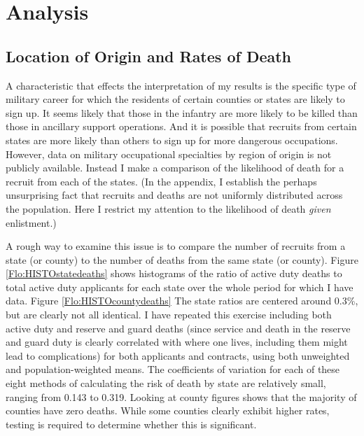 \documentclass[12pt] {article}
\begin{document}
\section{Analysis\label{sec:Analysis}}

\subsection{Location of Origin and Rates of Death}
A characteristic that effects the interpretation
of my results is the specific type of military career for which the
residents of certain counties or states are likely to sign up. It
seems likely that those in the infantry are more likely to be killed
than those in ancillary support operations. And it is possible that
recruits from certain states are more likely than others to sign up
for more dangerous occupations. However, data on military
occupational specialties by region of origin is not publicly available. Instead I make a comparison of the likelihood of death for a recruit from each
of the states. (In the appendix, I establish the perhaps unsurprising fact that recruits and deaths are not uniformly distributed across the population. Here I restrict my attention to the likelihood of death \textit{given} enlistment.) 

A rough way to examine this issue is to compare the number of recruits from a state (or county) to the number of deaths from the same state (or county). Figure \ref{Flo:HISTOstatedeaths} shows histograms of the ratio of active duty deaths to total active duty applicants for each state over the whole period for which I have data. Figure \ref{Flo:HISTOcountydeaths} The state ratios are centered around 0.3\%, but are clearly not all identical. I have repeated this exercise including both active duty and reserve and guard deaths (since service and death in the reserve and guard duty
is clearly correlated with where one lives, including them might lead
to complications) for both applicants and contracts, using both unweighted
and population-weighted means. The coefficients of variation for each
of these eight methods of calculating the risk of death by state are
relatively small, ranging from 0.143 to 0.319. Looking at county figures shows that the majority of counties have zero deaths. While some counties clearly exhibit higher rates, testing is required to determine whether this is significant. 
\end{document}
